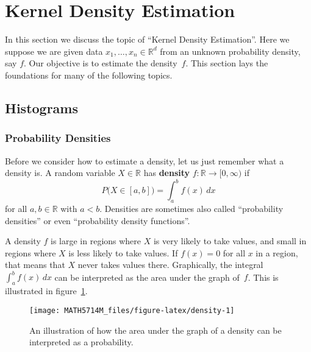\documentclass[
  a4paper,
]{article}
\theoremstyle{definition}
\theoremstyle{definition}
\theoremstyle{definition}
\theoremstyle{definition}
\theoremstyle{remark}
\begin{document}
\clearpage

\section{Kernel Density Estimation}\label{X01-KDE}

In this section we discuss the topic of ``Kernel Density Estimation''.
Here we suppose we are given data \(x_1,\ldots, x_n \in\mathbb{R}^d\) from an
unknown probability density, say \(f\). Our objective is to estimate
the density~\(f\). This section lays the foundations for many of the
following topics.

\subsection{Histograms}\label{histograms}

\subsubsection{Probability Densities}\label{probability-densities}

Before we consider how to estimate a density, let us just remember what a
density is. A random variable \(X \in \mathbb{R}\) has \textbf{density} \(f\colon
\mathbb{R}\to [0, \infty)\) if
\begin{equation*}
  P\bigl(X \in [a,b]\bigr)
  = \int_a^b f(x) \,dx
\end{equation*}
for all \(a, b\in\mathbb{R}\) with \(a < b\). Densities are sometimes also called
``probability densities'' or even ``probability density functions''.

A density \(f\) is large in regions where \(X\) is very likely to take
values, and small in regions where \(X\) is less likely to take values.
If \(f(x) = 0\) for all \(x\) in a region, that means that \(X\) never takes
values there. Graphically, the integral \(\int_a^b f(x) \,dx\) can be
interpreted as the area under the graph of~\(f\). This is illustrated
in figure~\ref{fig:density}.



\begin{figure}

{\centering \texttt{[image: MATH5714M\_files/figure-latex/density-1]} 

}

\caption{An illustration of how the area under the graph of a density can be interpreted as a probability.}\label{fig:density}
\end{figure}
\end{document}
